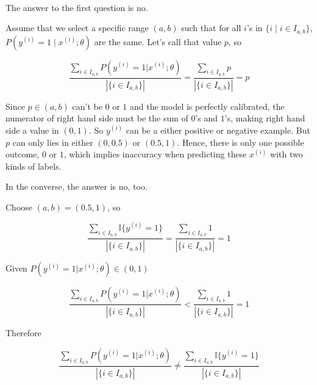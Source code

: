 \begin{answer}
	\\
	The answer to the first question is no.
	
	Assume that we select a specific range $(a, b)$ such that for all $i$'s in $\{i\mid i\in I_{a,b}\}$, $P(y^{(i)} = 1\mid x^{(i)}; \theta)$ are the same. Let's call that value $p$, so
	
	$$
	\frac{\sum_{i\in I_{a,b}} P\left(y^{(i)}=1|x^{(i)};\theta\right)} {{|\{i\in I_{a,b}\}|}}
	= \frac{\sum_{i\in I_{a,b}} p} {{|\{i\in I_{a,b}\}|}}
	= p
	$$
	
	Since $p\in (a,b)$ can't be $0$ or $1$ and the model is perfectly calibrated, the numerator of right hand side must be the sum of $0$'s and $1$'s, making right hand side a value in $(0, 1)$. So $y^{(i)}$ can be a either positive or negative example. But $p$ can only lies in either $(0, 0.5)$ or $(0.5, 1)$. Hence, there is only one possible outcome, $0$ or $1$, which implies inaccuracy when predicting these $x^{(i)}$ with two kinds of labels.
	
	In the converse, the answer is no, too.
	
	Choose $(a, b)=(0.5, 1)$, so
	
	$$
	\frac{\sum_{i\in I_{a,b}} \mathbb{I}\{y^{(i)} = 1\}}{|\{i\in I_{a,b}\}|} = \frac{\sum_{i\in I_{a,b}} 1}{|\{i\in I_{a,b}\}|} = 1
	$$
	
	Given $P\left(y^{(i)}=1|x^{(i)};\theta\right) \in (0, 1)$
	
	$$
	\frac{\sum_{i\in I_{a,b}} P\left(y^{(i)}=1|x^{(i)};\theta\right)} {{|\{i\in I_{a,b}\}|}}
	<\frac{\sum_{i\in I_{a,b}} 1} {{|\{i\in I_{a,b}\}|}} = 1
	$$
	
	Therefore
	
	$$
	\frac{\sum_{i\in I_{a,b}} P\left(y^{(i)}=1|x^{(i)};\theta\right)} {{|\{i\in I_{a,b}\}|}} \ne \frac{\sum_{i\in I_{a,b}} \mathbb{I}\{y^{(i)} = 1\}}{|\{i\in I_{a,b}\}|}
	$$
\end{answer}
